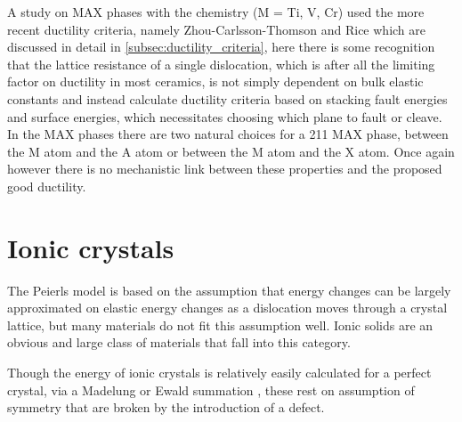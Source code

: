 A study on MAX phases \cite{Music2007ductility} with the chemistry  (M = Ti, V, Cr) used the more recent ductility criteria, namely Zhou-Carlsson-Thomson \cite{Zhou1994} and Rice \cite{Rice1992} which are discussed in detail in \autoref{subsec:ductility_criteria}, here there is some recognition that the lattice resistance of a single dislocation, which is after all the limiting factor on ductility in most ceramics, is not simply dependent on bulk elastic constants and instead calculate ductility criteria based on stacking fault energies and surface energies, which necessitates choosing which plane to fault or cleave. In the MAX phases there are two natural choices for a 211 MAX phase, between the M atom and the A atom or between the M atom and the X atom. Once again however there is no mechanistic link between these properties and the proposed good ductility. 

























\FloatBarrier
\section{Ionic crystals}
\FloatBarrier
\label{sec:ionic_crystals}


The Peierls model is based on the assumption that energy changes can be largely approximated on elastic energy changes as a dislocation moves through a crystal lattice, but many materials do not fit this assumption well. Ionic solids are an obvious and large class of materials that fall into this category.

Though the energy of ionic crystals is relatively easily calculated for a perfect crystal, via a Madelung or Ewald summation \cite{madelung1918,Ewald1921}, these rest on assumption of symmetry that are broken by the introduction of a defect.

